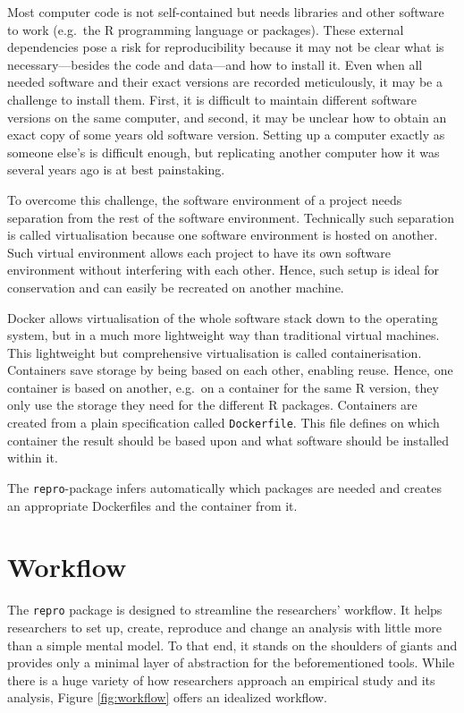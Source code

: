\documentclass[12pt,a4paper,]{article}
\begin{document}
Most computer code is not self-contained but needs libraries and other software to work (e.g.~the R programming language or packages).
These external dependencies pose a risk for reproducibility because it may not be clear what is necessary---besides the code and data---and how to install it.
Even when all needed software and their exact versions are recorded meticulously, it may be a challenge to install them.
First, it is difficult to maintain different software versions on the same computer, and second, it may be unclear how to obtain an exact copy of some years old software version.
Setting up a computer exactly as someone else's is difficult enough, but replicating another computer how it was several years ago is at best painstaking.

To overcome this challenge, the software environment of a project needs separation from the rest of the software environment. Technically such separation is called virtualisation because one software environment is hosted on another. Such virtual environment allows each project to have its own software environment without interfering with each other. Hence, such setup is ideal for conservation and can easily be recreated on another machine.

Docker allows virtualisation of the whole software stack down to the operating system, but in a much more lightweight way than traditional virtual machines. This lightweight but comprehensive virtualisation is called containerisation. Containers save storage by being based on each other, enabling reuse. Hence, one container is based on another, e.g.~on a container for the same R version, they only use the storage they need for the different R packages. Containers are created from a plain specification called \texttt{Dockerfile}. This file defines on which container the result should be based upon and what software should be installed within it.

The \texttt{repro}-package infers automatically which packages are needed and creates an appropriate Dockerfiles and the container from it.

\hypertarget{workflow}{%
\section{Workflow}\label{workflow}}

The \texttt{repro} package is designed to streamline the researchers' workflow.
It helps researchers to set up, create, reproduce and change an analysis with little more than a simple mental model.
To that end, it stands on the shoulders of giants and provides only a minimal layer of abstraction for the beforementioned tools.
While there is a huge variety of how researchers approach an empirical study and its analysis, Figure \ref{fig:workflow} offers an idealized workflow.
\end{document}
